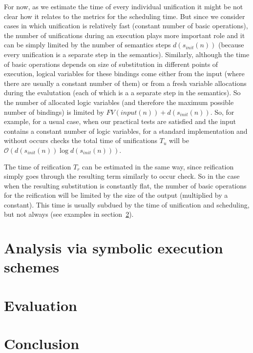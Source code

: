 \documentclass[acmsmall, anonymous, review]{acmart}
\newcommand{\sectionword}{section}
\renewcommand{\O}{\mathcal{O}}
\begin{document}
For now, as we estimate the time of every individual unification it might be not clear how it relates to the metrics for the scheduling time. But since we consider cases in which unification is relatively fast (constant number of basic operations), the number of unifications during an execution plays more important role and it can be simply limited by the number of semantics steps $d(s_{init}(n))$ (because every unification is a separate step in the semantics). Similarly, although the time of basic operations depends on size of substitution in different points of execution, logical variables for these bindings come either from the input (where there are usually a constant number of them) or from a fresh variable allocations during the evalutation (each of which is a a separate step in the semantics). So the number of allocated logic variables (and therefore the maximum possible number of bindings) is limited by $FV(input(n)) + d(s_{init}(n))$. So, for example, for a usual case, when our practical tests are satisfied and the input contains a constant number of logic variables, for a standard implementation and without occurs checks the total time of unifications $T_u$ will be $\O(d(s_{init}(n)) \log d(s_{init}(n)))$.

The time of reification $T_r$ can be estimated in the same way, since reification simply goes through the resulting term similarly to occur check. So in the case when the resulting substitution is constantly flat, the number of basic operations for the reification will be limited by the size of the output (multiplied by a constant). This time is usually subdued by the time of unification and scheduling, but not always (see examples in \sectionword~\ref{sec:evaluation}).




\section{Analysis via symbolic execution schemes}

\section{Evaluation}
\label{sec:evaluation}


\section{Conclusion}
\end{document}
